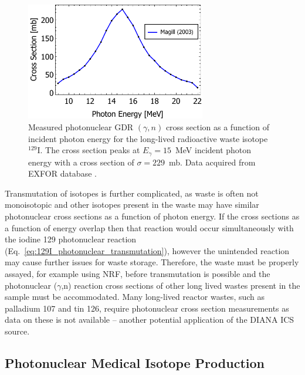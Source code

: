 \documentclass[../main.tex]{subfiles}
\begin{document}
\begin{figure}[!h]
\centering
\includegraphics[width=0.7\textwidth]{Figures/DIANA_Inverse_Compton_Source_Design/Iodine_129_cs_photon_energy.pdf}
\caption{Measured \cite{magill2003laser} photonuclear GDR $\left(\gamma,n\right)$ cross section as a function of incident photon energy for the long-lived radioactive waste isotope $^{129}\mathrm{I}$. The cross section peaks at $E_{\gamma} = 15$~\si{\mega\electronvolt} incident photon energy with a cross section of $\sigma = 229$~\si{\milli\barn}. Data acquired from EXFOR database \cite{zerkin2018experimental}.}
\label{fig:I129_cross_section_photon_energy}
\end{figure}

Transmutation of isotopes is further complicated, as waste is often not monoisotopic and other isotopes present in the waste may have similar photonuclear cross sections as a function of photon energy. If the cross sections as a function of energy overlap then that reaction would occur simultaneously with the iodine 129 photonuclear reaction (Eq.~\ref{eq:129I_photonuclear_transmutation}), however the unintended  reaction may cause further issues for waste storage. Therefore, the waste must be properly assayed, for example using NRF, before transmutation is possible and the photonuclear ($\gamma$,n) reaction cross sections of other long lived wastes present in the sample must be accommodated. Many long-lived reactor wastes, such as palladium 107 and tin 126, require photonuclear cross section measurements as data on these is not available \cite{zerkin2018experimental} -- another potential application of the DIANA ICS source. 

\subsection{Photonuclear Medical Isotope Production}
\label{sec:photonuclear_medical_isotope_production}
\end{document}
